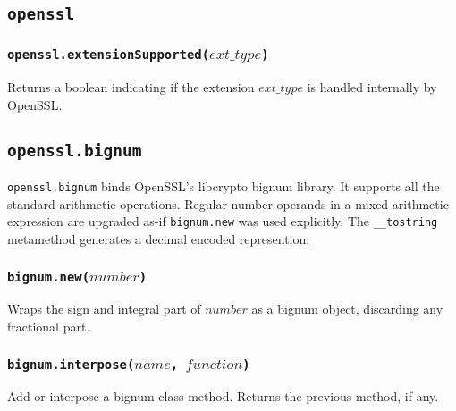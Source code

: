 \documentclass[11pt, oneside]{memoir}
\newcommand*{\fn}[1]{\texttt{#1}\xspace}
\newcommand*{\method}[1]{\texttt{#1}\xspace}
\newcommand*{\module}[1]{\texttt{#1}\xspace}
\newcounter{toccols}
\newenvironment{Module}[1]{
	\subsection{\texttt{#1}}
	\addtocontents{toc}{
		\protect\begin{multicols}{\value{toccols}}
	}
}{
	\addtocontents{toc}{\protect\end{multicols}}
}
\begin{document}
\begin{Module}{openssl}
\subsubsection[\fn{openssl.extensionSupported}]{\fn{openssl.extensionSupported($ext\_type$)}}

Returns a boolean indicating if the extension $ext\_type$ is handled internally by OpenSSL.

\end{Module}


\begin{Module}{openssl.bignum}

\module{openssl.bignum} binds OpenSSL's libcrypto bignum library. It supports all the standard arithmetic operations. Regular number operands in a mixed arithmetic expression are upgraded as-if \method{bignum.new} was used explicitly. The \fn{\_\_tostring} metamethod generates a decimal encoded represention.

\subsubsection[\fn{bignum.new}]{\fn{bignum.new($number$)}}

Wraps the sign and integral part of $number$ as a bignum object, discarding any fractional part.

\subsubsection[\fn{bignum.interpose}]{\fn{bignum.interpose($name$, $function$)}}

Add or interpose a bignum class method. Returns the previous method, if any.

\end{Module}
\end{document}
